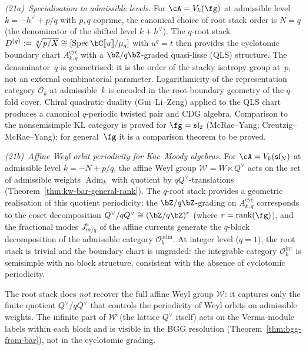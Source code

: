 \emph{(21a)~Specialisation to admissible levels.}%
\label{item:concordance-cyclotomic-admissible}%
%
\ClaimStatusConjectured{}
For $\cA = V_k(\fg)$ at admissible level
$k = -h^\vee + p/q$ with $p, q$ coprime, the
canonical choice of root stack order is $N = q$
(the denominator of the shifted level $k + h^\vee$).
The $q$-root stack
$D^{(q)} := \sqrt[q]{p/X}
\cong [\operatorname{Spec}\bC[\![u]\!]/\mu_q]$
with $u^q = t$ then provides the cyclotomic boundary
chart $A^{\mathrm{cyc}}_{k,q}$ with a
$\bZ/q\bZ$-graded quasi-lisse (QLS) structure.
The denominator~$q$ is geometrised: it is the
order of the stacky isotropy group at~$p$, not an
external combinatorial parameter.
Logarithmicity of the representation category
$\mathcal{O}_k$ at admissible~$k$ is encoded in
the root-boundary geometry of the $q$-fold cover.
Chiral quadratic duality (Gui--Li--Zeng) applied to the
QLS chart produces a canonical $q$-periodic
twisted pair and CDG algebra.
Comparison to the nonsemisimple KL category is proved for
$\fg = \mathfrak{sl}_2$ (McRae--Yang;
Creutzig--McRae--Yang);
for general~$\fg$ it is a comparison theorem to be proved.

\emph{(21b)~Affine Weyl orbit periodicity for Kac--Moody algebras.}%
\label{item:concordance-cyclotomic-km}%
%
%
\ClaimStatusConjectured{}
For $\cA = V_k(\mathfrak{sl}_N)$ at admissible level
$k = -N + p/q$, the affine Weyl group
$\mathcal{W} = W \ltimes Q^\vee$
acts on the set of admissible weights
$\operatorname{Adm}_k$ with quotient by
$q Q^\vee$-translations
(Theorem~\ref{thm:kw-bar-general-rank}).
The $q$-root stack provides a geometric
realisation of this quotient periodicity: the
$\bZ/q\bZ$-grading on $A^{\mathrm{cyc}}_{k,q}$
corresponds to the coset decomposition
$Q^\vee / q Q^\vee \cong (\bZ/q\bZ)^r$
(where $r = \operatorname{rank}(\fg)$),
and the fractional
modes $J^a_{m/q}$ of the affine currents
generate the $q$-block decomposition of the
admissible category
$\mathcal{O}_k^{\mathrm{adm}}$.
At integer level ($q = 1$), the root stack is
trivial and the boundary chart is ungraded: the
integrable category $\mathcal{O}_k^{\mathrm{int}}$
is semisimple with no block structure, consistent
with the absence of cyclotomic periodicity.

The root stack does \emph{not} recover the full
affine Weyl group $\mathcal{W}$: it captures only
the finite quotient
$Q^\vee / q Q^\vee$ that controls
the periodicity of Weyl orbits on admissible weights.
The infinite part of $\mathcal{W}$ (the lattice
$Q^\vee$ itself) acts on the Verma-module labels
within each block and is visible in the BGG resolution
(Theorem~\ref{thm:bgg-from-bar}), not in the
cyclotomic grading.

